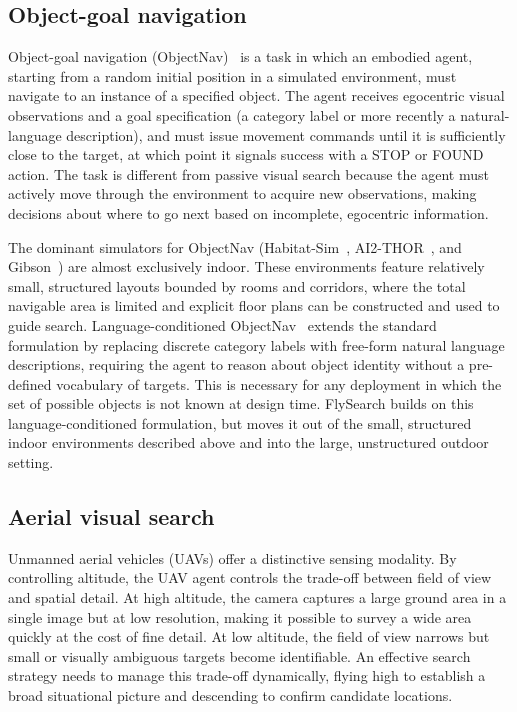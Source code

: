 \subsection{Object-goal navigation}
\label{sec:prelim-objectnav}

Object-goal navigation (ObjectNav)~\cite{batra2020objectnav} is a task in which an embodied agent, starting from a random initial position in a simulated environment, must navigate to an instance of a specified object. The agent receives egocentric visual observations and a goal specification (a category label or more recently a natural-language description), and must issue movement commands until it is sufficiently close to the target, at which point it signals success with a STOP or FOUND action. The task is different from passive visual search because the agent must actively move through the environment to acquire new observations, making decisions about where to go next based on incomplete, egocentric information.

The dominant simulators for ObjectNav (Habitat-Sim~\cite{savva2019habitat}, AI2-THOR~\cite{kolve2017ai2}, and Gibson~\cite{xia2018gibson}) are almost exclusively indoor. These environments feature relatively small, structured layouts bounded by rooms and corridors, where the total navigable area is limited and explicit floor plans can be constructed and used to guide search. Language-conditioned ObjectNav~\cite{majumdar2022zson,gadre2023cows} extends the standard formulation by replacing discrete category labels with free-form natural language descriptions, requiring the agent to reason about object identity without a pre-defined vocabulary of targets. This is necessary for any deployment in which the set of possible objects is not known at design time. FlySearch builds on this language-conditioned formulation, but moves it out of the small, structured indoor environments described above and into the large, unstructured outdoor setting.

\subsection{Aerial visual search}
\label{sec:prelim-uav}

Unmanned aerial vehicles (UAVs) offer a distinctive sensing modality. By controlling altitude, the UAV agent controls the trade-off between field of view and spatial detail. At high altitude, the camera captures a large ground area in a single image but at low resolution, making it possible to survey a wide area quickly at the cost of fine detail. At low altitude, the field of view narrows but small or visually ambiguous targets become identifiable. An effective search strategy needs to manage this trade-off dynamically, flying high to establish a broad situational picture and descending to confirm candidate locations.


